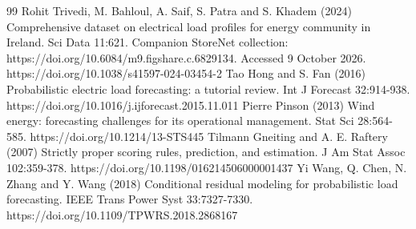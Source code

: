 \documentclass[pdflatex,Numbered,sn-basic]{sn-jnl}
\begin{document}
\begin{thebibliography}{99}
 Rohit Trivedi, M. Bahloul, A. Saif, S. Patra and S. Khadem (2024) Comprehensive dataset on electrical load profiles for energy community in Ireland. Sci Data 11:621. Companion StoreNet collection: https://doi.org/10.6084/m9.figshare.c.6829134. Accessed 9 October 2026. https://doi.org/10.1038/s41597-024-03454-2
 Tao Hong and S. Fan (2016) Probabilistic electric load forecasting: a tutorial review. Int J Forecast 32:914-938. https://doi.org/10.1016/j.ijforecast.2015.11.011
 Pierre Pinson (2013) Wind energy: forecasting challenges for its operational management. Stat Sci 28:564-585. https://doi.org/10.1214/13-STS445
 Tilmann Gneiting and A. E. Raftery (2007) Strictly proper scoring rules, prediction, and estimation. J Am Stat Assoc 102:359-378. https://doi.org/10.1198/016214506000001437
 Yi Wang, Q. Chen, N. Zhang and Y. Wang (2018) Conditional residual modeling for probabilistic load forecasting. IEEE Trans Power Syst 33:7327-7330. https://doi.org/10.1109/TPWRS.2018.2868167
\end{thebibliography}
\end{document}
